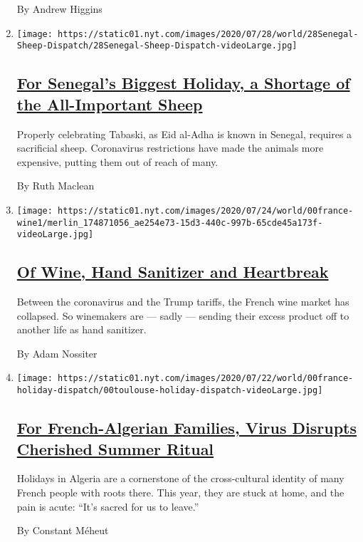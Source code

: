 \begin{enumerate}
  By Andrew Higgins
\item
  \texttt{[image: https://static01.nyt.com/images/2020/07/28/world/28Senegal-Sheep-Dispatch/28Senegal-Sheep-Dispatch-videoLarge.jpg]}

  \hypertarget{for-senegals-biggest-holiday-a-shortage-of-the-all-important-sheep}{%
  \subsection{\texorpdfstring{\href{/2020/07/29/world/africa/senegal-tabaski-sheep-eid-adha.html}{For
  Senegal's Biggest Holiday, a Shortage of the All-Important
  Sheep}}{For Senegal's Biggest Holiday, a Shortage of the All-Important Sheep}}\label{for-senegals-biggest-holiday-a-shortage-of-the-all-important-sheep}}

  Properly celebrating Tabaski, as Eid al-Adha is known in Senegal,
  requires a sacrificial sheep. Coronavirus restrictions have made the
  animals more expensive, putting them out of reach of many.

  By Ruth Maclean
\item
  \texttt{[image: https://static01.nyt.com/images/2020/07/24/world/00france-wine1/merlin\_174871056\_ae254e73-15d3-440c-997b-65cde45a173f-videoLarge.jpg]}

  \hypertarget{of-wine-hand-sanitizer-and-heartbreak}{%
  \subsection{\texorpdfstring{\href{/2020/07/27/world/europe/france-alsace-wine-coronavirus.html}{Of
  Wine, Hand Sanitizer and
  Heartbreak}}{Of Wine, Hand Sanitizer and Heartbreak}}\label{of-wine-hand-sanitizer-and-heartbreak}}

  Between the coronavirus and the Trump tariffs, the French wine market
  has collapsed. So winemakers are --- sadly --- sending their excess
  product off to another life as hand sanitizer.

  By Adam Nossiter
\item
  \texttt{[image: https://static01.nyt.com/images/2020/07/22/world/00france-holiday-dispatch/00toulouse-holiday-dispatch-videoLarge.jpg]}

  \hypertarget{for-french-algerian-families-virus-disrupts-cherished-summer-ritual}{%
  \subsection{\texorpdfstring{\href{/2020/07/26/world/europe/france-algeria-summer-vacations.html}{For
  French-Algerian Families, Virus Disrupts Cherished Summer
  Ritual}}{For French-Algerian Families, Virus Disrupts Cherished Summer Ritual}}\label{for-french-algerian-families-virus-disrupts-cherished-summer-ritual}}

  Holidays in Algeria are a cornerstone of the cross-cultural identity
  of many French people with roots there. This year, they are stuck at
  home, and the pain is acute: ``It's sacred for us to leave.''

  By Constant Méheut
\end{enumerate}

